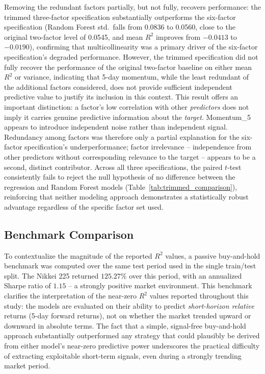 \documentclass[11pt]{article}
\begin{document}
Removing the redundant factors partially, but not fully, recovers performance: the trimmed three-factor specification substantially outperforms the six-factor specification (Random Forest std.\ falls from 0.0836 to 0.0560, close to the original two-factor level of 0.0545, and mean $R^2$ improves from $-0.0413$ to $-0.0190$), confirming that multicollinearity was a primary driver of the six-factor specification's degraded performance. However, the trimmed specification did not fully recover the performance of the original two-factor baseline on either mean $R^2$ or variance, indicating that 5-day momentum, while the least redundant of the additional factors considered, does not provide sufficient independent predictive value to justify its inclusion in this context. This result offers an important distinction: a factor's low correlation with other \emph{predictors} does not imply it carries genuine predictive information about the \emph{target}. Momentum\_5 appears to introduce independent noise rather than independent signal. Redundancy among factors was therefore only a partial explanation for the six-factor specification's underperformance; factor irrelevance -- independence from other predictors without corresponding relevance to the target -- appears to be a second, distinct contributor. Across all three specifications, the paired $t$-test consistently fails to reject the null hypothesis of no difference between the regression and Random Forest models (Table~\ref{tab:trimmed_comparison}), reinforcing that neither modeling approach demonstrates a statistically robust advantage regardless of the specific factor set used.

\subsection{Benchmark Comparison}

To contextualize the magnitude of the reported $R^2$ values, a passive buy-and-hold benchmark was computed over the same test period used in the single train/test split. The Nikkei 225 returned $125.27\%$ over this period, with an annualized Sharpe ratio of $1.15$ -- a strongly positive market environment. This benchmark clarifies the interpretation of the near-zero $R^2$ values reported throughout this study: the models are evaluated on their ability to predict \emph{short-horizon relative} returns (5-day forward returns), not on whether the market trended upward or downward in absolute terms. The fact that a simple, signal-free buy-and-hold approach substantially outperformed any strategy that could plausibly be derived from either model's near-zero predictive power underscores the practical difficulty of extracting exploitable short-term signals, even during a strongly trending market period.
\end{document}
